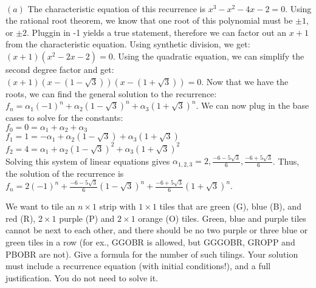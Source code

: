 \documentclass[11pt]{article}
\begin{document}
\begin{solution} \\
	$(a)$ 
		The characteristic equation of this recurrence is $x^3 - x^2 -4x - 2 = 0$. Using the rational root theorem, we know that one root of this polynomial must be $\pm1$, or $\pm 2$. Pluggin in -1 yields a true statement, therefore we can factor out an $x+1$ from the characteristic equation. Using synthetic division, we get: $(x+1)(x^2 - 2x - 2) = 0$. Using the quadratic equation, we can simplify the second degree factor and get: $(x+1)(x - (1 - \sqrt{3}))(x-(1+ \sqrt{3})) = 0$. Now that we have the roots, we can find the general solution to the recurrence: $f_n = \alpha_1(-1)^n + \alpha_2(1 - \sqrt{3})^n + \alpha_3(1 + \sqrt{3})^n $. We can now plug in the base cases to solve for the constants: \\ $f_0 = 0 = \alpha_1 + \alpha_2 + \alpha_3$ \\ $ f_1 = 1 = -\alpha_1 + \alpha_2(1-\sqrt{3}) + \alpha_3(1+\sqrt{3}) $ \\ $ f_2 = 4 = \alpha_1 + \alpha_2(1-\sqrt{3})^2 + \alpha_3(1+\sqrt{3})^2 $ \\ Solving this system of linear equations gives $\alpha_{1,2,3} = 2, \frac{-6 - 5\sqrt{3}}{6}, \frac{-6 + 5\sqrt{3}}{6} $. Thus, the solution of the recurrence is $f_n = 2(-1)^n + \frac{-6 - 5\sqrt{3}}{6}(1 - \sqrt{3})^n + \frac{-6 + 5\sqrt{3}}{6}(1 + \sqrt{3})^n $.
\end{solution}

\newpage
\begin{problem}
	We want to tile an $n\times 1$ strip with $1\times 1$ tiles that are green (G), blue (B), and red (R), $2\times 1$ purple (P) and $2\times 1$ orange (O) tiles. Green, blue and purple tiles cannot be next to each other, and there should be no two purple or three blue or green tiles in a row (for ex., GGOBR is allowed, but GGGOBR, GROPP and PBOBR are not). Give a formula for the number of such tilings. Your solution must include a recurrence equation (with initial conditions!), and a full justification. You do not need to solve it. 
\end{problem}
\end{document}
